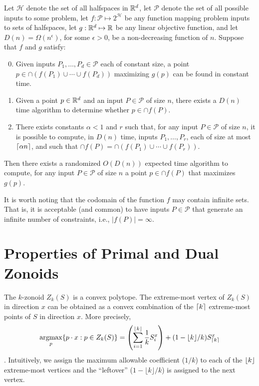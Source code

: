 \documentclass[lotsofwhite]{patmorin}
\DeclareMathOperator*{\argmax}{argmax}
\begin{document}
\begin{thm}[Chan 2004]
Let $\mathcal{H}$ denote the set of all halfspaces in $\mathbb{R}^d$,
let $\mathcal{P}$ denote the set of all possible inputs to some problem, 
let $f:\mathcal{P}\mapsto 2^{\mathcal{H}}$ be any function mapping 
problem inputs to sets of halfspaces,
let $g:\mathbb{R}^d\mapsto \mathbb{R}$ be
any linear objective function, 
and let $D(n)=\Omega(n^{\epsilon})$, for some $\epsilon>0$, be a non-decreasing function of
$n$.  Suppose that $f$ and $g$ satisfy:
\begin{enumerate}
\setcounter{enumi}{-1}
\item Given inputs $P_1,\ldots,P_d\in\mathcal{P}$ each of constant
size, a point $p\in\cap (f(P_1)\cup\cdots\cup f(P_d))$ maximizing
$g(p)$ can be found in constant time.

\item Given a point $p\in\mathbb{R}^d$ and an input $P\in\mathcal{P}$
of size $n$, there exists a $D(n)$ time algorithm to determine whether
$p\in\cap f(P)$.

\item There exists constants $\alpha < 1$ and $r$ such that, for any
input $P\in\mathcal{P}$ of size $n$, it is possible to compute, in
$D(n)$ time, inputs $P_1,\ldots,P_r$, each of size at most
$\left\lceil \alpha n \right\rceil$, and such that $\cap f(P) =
\cap(f(P_1)\cup\cdots\cup f(P_r))$.

\end{enumerate}
Then there exists a randomized $O(D(n))$ expected time algorithm to
compute, for any input $P\in\mathcal{P}$ of size $n$ a point
$p\in\cap f(P)$ that maximizes $g(p)$.
\end{thm}

It is worth noting that the codomain of the function $f$ may contain
infinite sets.  That is, it is acceptable (and common) to have inputs
$P\in\mathcal{P}$ that generate an infinite number of constraints,
i.e., $|f(P)|=\infty$.


\section{Properties of Primal and Dual Zonoids}

The $k$-zonoid $Z_k(S)$ is a convex polytope.  The extreme-most vertex
of $Z_k(S)$ in direction $x$ can be obtained as a convex combination of the
$\left\lceil k \right\rceil$ extreme-most points of $S$ in direction $x$.  More
precisely,
\begin{equation} 
\argmax_p\{p\cdot x: p\in Z_k(S)\} =
        \left(\sum_{i=1}^{\floor{k}} \frac{1}{k}S_i^x\right) +
          (1-\lfloor k\rfloor/k)S_{\ceil{k}}^x  
          \eqlabel{extreme}
\end{equation}
\cite{be01,gm06}.  Intuitively, we assign the maximum allowable
coefficient ($1/k$) to each of the $\left\lfloor k \right\rfloor$ extreme-most vertices
and the ``leftover'' ($1-\lfloor k\rfloor/k$) is assigned to the next vertex.
\end{document}
